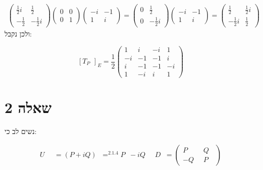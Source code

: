 \documentclass{article}
\DeclareMathOperator*{\equals}{=}
\DeclareMathOperator{\adj}{^\ast}
\DeclareMathOperator{\tra}{^t}
\begin{document}
\begin{align*}
\begin{pmatrix}
                              \frac 1 2 i & \frac 1 2    \\
                              -\frac 1 2  & -\frac 1 2 i
                          \end{pmatrix} \begin{pmatrix}
                                            0 & 0 \\
                                            0 & 1
                                        \end{pmatrix} \begin{pmatrix}
                                                          -i & -1 \\
                                                          1  & i
                                                      \end{pmatrix}
    = \begin{pmatrix}
          0 & \frac 1 2     \\
          0 & - \frac 1 2 i
      \end{pmatrix} \begin{pmatrix}
                        -i & -1 \\
                        1  & i
                    \end{pmatrix} =
    \begin{pmatrix}
        \frac 1 2     & \frac 1 2 i \\
        - \frac 1 2 i & \frac 1 2
    \end{pmatrix}
\end{align*}
ולכן נקבל:

\[
    [T_{P \adj}]_E = \frac 1 2 \begin{pmatrix}
        1  & i  & -i & 1  \\
        -i & -1 & -1 & i  \\
        i  & -1 & -1 & -i \\
        1  & -i & i  & 1
    \end{pmatrix}
\]

\pagebreak

\section*{שאלה 2}

נשים לב כי:

\begin{align*}
    U \adj & = (P+iQ) \adj \equals^{2.1.4} P \tra - iQ\tra & D \tra = \begin{pmatrix}
                                                                          P \tra   & Q \tra \\
                                                                          - Q \tra & P \tra
                                                                      \end{pmatrix}
\end{align*}
\end{document}
